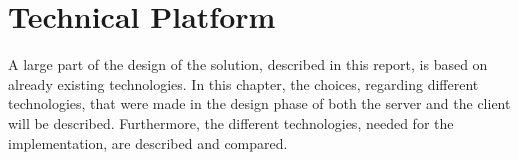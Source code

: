 \chapter{Technical Platform}\label{cha:technicalPlatform}

A large part of the design of the solution, described in this report, is based on already existing technologies. 
In this chapter, the choices, regarding different technologies, that were made in the design phase of both the server and the client will be described. Furthermore, the different technologies, needed for the implementation, are described and compared.







